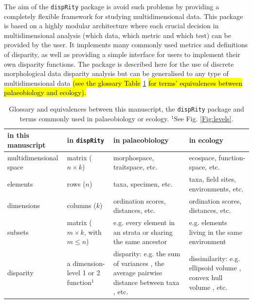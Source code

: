 \documentclass[12pt,letterpaper]{article}
\newcommand{\disp}{\texttt{dispRity} }
\begin{document}
The aim of the \disp package is avoid such problems by providing a completely flexible framework for studying multidimensional data.
This package is based on a highly modular architecture where each crucial decision in multidimensional analysis (which data, which metric and which test) can be provided by the user.
It implements many commonly used metrics and definitions of disparity, as well as providing a simple interface for users to implement their own disparity functions.
The package is described here for the use of discrete morphological data disparity analysis but can be generalised to any type of multidimensional data
\hl{(see the glossary Table}
\ref{Tab:terms}
\hl{for terms' equivalences between palaeobiology and ecology).}

\begin{landscape}
\begin{table}
    \begin{tabular}{p{4cm}p{5cm}p{6cm}p{6cm}}
        \hline
        in this manuscript & in \texttt{dispRity} & in palaeobiology & in ecology \\ 
        \hline
        multidimensional space & matrix ($n\times k$) & morphospace, traitspace, etc. & ecospace, function-space, etc. \\
        elements & rows ($n$) & taxa, specimen, etc. & taxa, field sites, environments, etc. \\
        dimensions & columns ($k$) & ordination scores, distances, etc. & ordination scores, distances, etc. \\
        subsets & matrix ($m \times k$, with $m \leq n$) & e.g. every element in an strata or sharing the same ancestor & e.g. elements living in the same environment \\
        disparity & a dimension-level 1 or 2 function$^1$ & disparity: e.g. the sum of variances \cite{Wills2001}, the average pairwise distance between taxa \cite{Foote01071994}, etc. & dissimilarity: e.g. ellipsoid volume \cite{DonohueDim}, convex hull volume \cite{cornwell2006trait}, etc. \\
        \hline
    \end{tabular}
    \caption{Glossary and equivalences between this manuscript, the \texttt{dispRity} package and terms commonly used in palaeobiology or ecology. $^1$See Fig. \ref{Fig:levels}.}
    \label{Tab:terms}
\end{table}
\end{landscape}
\end{document}
